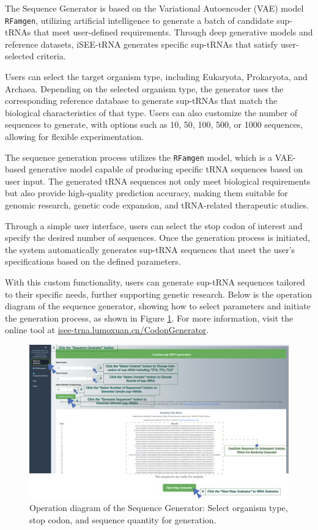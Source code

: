The Sequence Generator is based on the Variational Autoencoder (VAE) model \texttt{RFamgen}, utilizing artificial intelligence to generate a batch of candidate sup-tRNAs that meet user-defined requirements. Through deep generative models and reference datasets, iSEE-tRNA generates specific sup-tRNAs that satisfy user-selected criteria.

Users can select the target organism type, including Eukaryota, Prokaryota, and Archaea. Depending on the selected organism type, the generator uses the corresponding reference database to generate sup-tRNAs that match the biological characteristics of that type. Users can also customize the number of sequences to generate, with options such as 10, 50, 100, 500, or 1000 sequences, allowing for flexible experimentation.

The sequence generation process utilizes the \texttt{RFamgen} model, which is a VAE-based generative model capable of producing specific tRNA sequences based on user input. The generated tRNA sequences not only meet biological requirements but also provide high-quality prediction accuracy, making them suitable for genomic research, genetic code expansion, and tRNA-related therapeutic studies.

Through a simple user interface, users can select the stop codon of interest and specify the desired number of sequences. Once the generation process is initiated, the system automatically generates sup-tRNA sequences that meet the user's specifications based on the defined parameters.

With this custom functionality, users can generate sup-tRNA sequences tailored to their specific needs, further supporting genetic research. Below is the operation diagram of the sequence generator, showing how to select parameters and initiate the generation process, as shown in Figure \ref{fig:custom_gen}. For more information, visit the online tool at \href{https://isee-trna.lumoxuan.cn/CodonGenerator}{isee-trna.lumoxuan.cn/CodonGenerator}.

\begin{figure}[H]
    \centering
    \includegraphics[width=\textwidth]{images/Custom}
    \caption{Operation diagram of the Sequence Generator: Select organism type, stop codon, and sequence quantity for generation.}
    \label{fig:custom_gen}
\end{figure}

